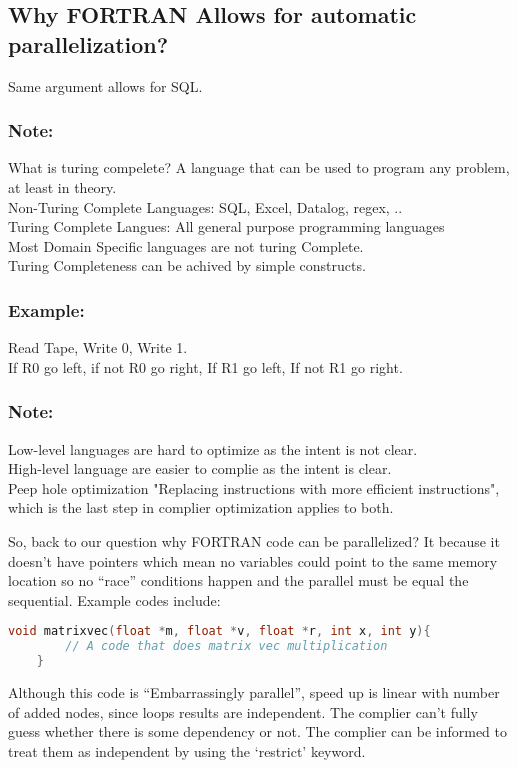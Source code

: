 \documentclass[twoside]{article}
\begin{document}
\subsection{Why FORTRAN Allows for automatic parallelization?}
Same argument allows for SQL.
\subsubsection*{Note:}
What is turing compelete? A language that can be used to program any problem, at least in theory.\\
Non-Turing Complete Languages: SQL, Excel, Datalog, regex, ..\\
Turing Complete Langues: All general purpose programming languages \\
Most Domain Specific languages are not turing Complete. \\
Turing Completeness can be achived by simple constructs.\\

\subsubsection*{Example:}
Read Tape, Write 0, Write 1. \\
If R0 go left, if not R0 go right, If R1 go left, If not R1 go right.


\subsubsection*{Note:}
Low-level languages are hard to optimize as the intent is not clear.\\
High-level language are easier to complie as the intent is clear.\\
Peep hole optimization "Replacing instructions with more efficient instructions", which is the last step in complier optimization applies to both.

    
So, back to our question why FORTRAN code can be parallelized? It because it doesn't have pointers which mean no variables could point to the same memory location so no ``race'' conditions happen and the parallel must be equal the sequential. Example codes include:
\begin{lstlisting}[language=c++]
    void matrixvec(float *m, float *v, float *r, int x, int y){
        // A code that does matrix vec multiplication
    }
\end{lstlisting}
Although this code is ``Embarrassingly parallel'', speed up is linear with number of added nodes, since loops results are independent. The complier can't fully guess whether there is some dependency or not. The complier can be informed to treat them as independent by using the `restrict' keyword. 
\end{document}
